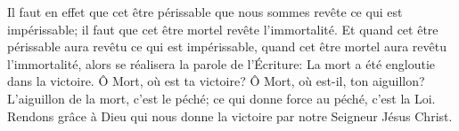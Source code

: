 Il faut en effet que cet être périssable que nous sommes
	revête ce qui est impérissable;
	il faut que cet être mortel revête l’immortalité.
Et quand cet être périssable aura revêtu ce qui est impérissable,
	quand cet être mortel aura revêtu l’immortalité,
	alors se réalisera la parole de l’Écriture:
	La mort a été engloutie dans la victoire.
Ô Mort, où est ta victoire?
Ô Mort, où est-il, ton aiguillon?
L’aiguillon de la mort, c’est le péché;
	ce qui donne force au péché, c’est la Loi.
Rendons grâce à Dieu qui nous donne la victoire par notre Seigneur Jésus Christ.
